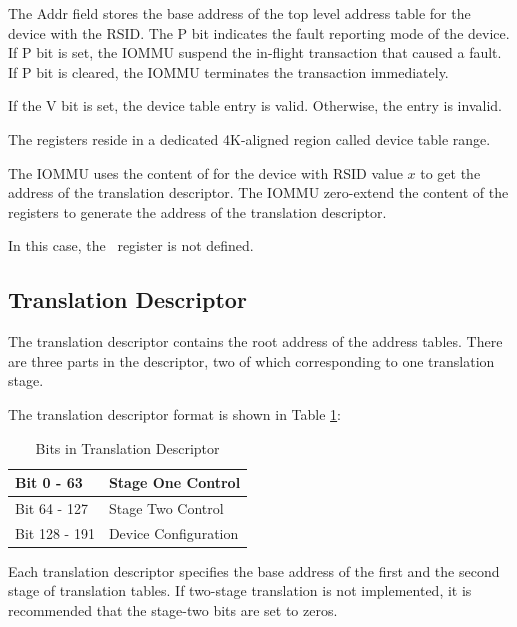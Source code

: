 The Addr field stores the base address of the top level address table for the device with
the RSID. The P bit indicates the fault reporting mode of the device. If P bit is set, the
IOMMU suspend the in-flight transaction that caused a fault. If P bit is cleared, the
IOMMU terminates the transaction immediately. 

If the V bit is set, the device table entry is valid. Otherwise, the entry is invalid.

The \dte[$x$] registers reside in a dedicated 4K-aligned region called device table range.

The IOMMU uses the content of \dte[$x$] for the device with RSID value $x$ to get the
address of the translation descriptor. The IOMMU zero-extend the content of the \dte[$x$]
registers to generate the address of the translation descriptor.

In this case, the \dtbase\ register is not defined.

\subsection{Translation Descriptor}
\label{sec:trans_desc}

The translation descriptor contains the root address of the address tables. There are
three parts in the descriptor, two of which corresponding to one translation stage.

The translation descriptor format is shown in Table \ref{tbl:dev-tbl-bits}:

\begin{table}[h!t]
    \centering
    \begin{tabular}{ | l | l | }

    \hline
    Bit 0 - 63   & Stage One Control \\
    \hline
    Bit 64 - 127 & Stage Two Control \\
    \hline
    Bit 128 - 191 & Device Configuration \\
    \hline

    \end{tabular}
    \caption{Bits in Translation Descriptor}
    \label{tbl:dev-tbl-bits}
\end{table}


Each translation descriptor specifies the base address of the first and the second stage
of translation tables. If two-stage translation is not implemented, it is recommended that
the stage-two bits are set to zeros. 

